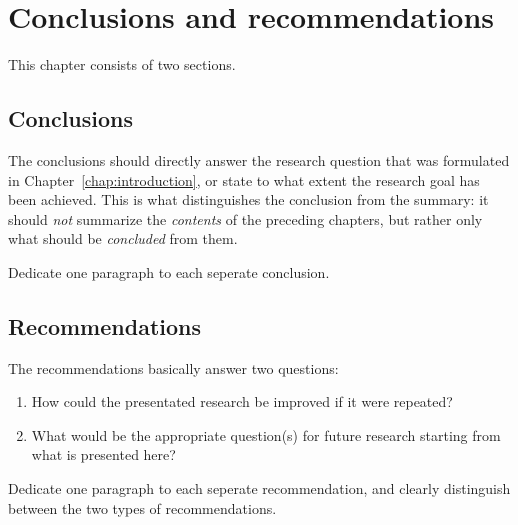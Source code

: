 \chapter{Conclusions and recommendations}
\label{chap:conclusions}
This chapter consists of two sections.
\section{Conclusions}
The conclusions should directly answer the research question that was formulated in Chapter~\ref{chap:introduction}, or state to what extent the research goal has been achieved. This is what distinguishes the conclusion from the summary: it should \emph{not} summarize the \emph{contents} of the preceding chapters, but rather only what should be \emph{concluded} from them. 

Dedicate one paragraph to each seperate conclusion.

\section{Recommendations}
The recommendations basically answer two questions:
\begin{enumerate}
\item How could the presentated research be improved if it were repeated?
\item What would be the appropriate question(s) for future research starting from what is presented here?  
\end{enumerate} 
Dedicate one paragraph to each seperate recommendation, and clearly distinguish between the two types of recommendations.